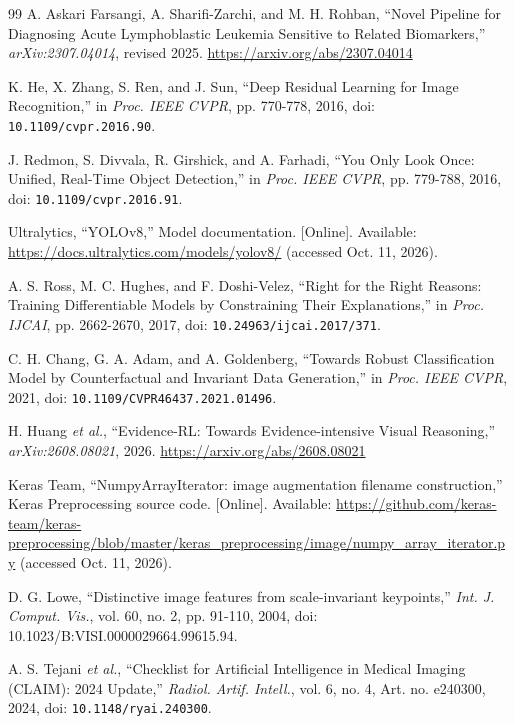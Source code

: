 \begin{thebibliography}{99}
 A. Askari Farsangi, A. Sharifi-Zarchi, and M. H. Rohban, ``Novel Pipeline for Diagnosing Acute Lymphoblastic Leukemia Sensitive to Related Biomarkers,'' \emph{arXiv:2307.04014}, revised 2025. \url{https://arxiv.org/abs/2307.04014}

 K. He, X. Zhang, S. Ren, and J. Sun, ``Deep Residual Learning for Image Recognition,'' in \emph{Proc. IEEE CVPR}, pp. 770-778, 2016, doi: \nolinkurl{10.1109/cvpr.2016.90}.

 J. Redmon, S. Divvala, R. Girshick, and A. Farhadi, ``You Only Look Once: Unified, Real-Time Object Detection,'' in \emph{Proc. IEEE CVPR}, pp. 779-788, 2016, doi: \nolinkurl{10.1109/cvpr.2016.91}.

 Ultralytics, ``YOLOv8,'' Model documentation. [Online]. Available: \url{https://docs.ultralytics.com/models/yolov8/} (accessed Oct. 11, 2026).

 A. S. Ross, M. C. Hughes, and F. Doshi-Velez, ``Right for the Right Reasons: Training Differentiable Models by Constraining Their Explanations,'' in \emph{Proc. IJCAI}, pp. 2662-2670, 2017, doi: \nolinkurl{10.24963/ijcai.2017/371}.

 C. H. Chang, G. A. Adam, and A. Goldenberg, ``Towards Robust Classification Model by Counterfactual and Invariant Data Generation,'' in \emph{Proc. IEEE CVPR}, 2021, doi: \nolinkurl{10.1109/CVPR46437.2021.01496}.

 H. Huang \emph{et al.}, ``Evidence-RL: Towards Evidence-intensive Visual Reasoning,'' \emph{arXiv:2608.08021}, 2026. \url{https://arxiv.org/abs/2608.08021}

 Keras Team, ``NumpyArrayIterator: image augmentation filename construction,'' Keras Preprocessing source code. [Online]. Available: \url{https://github.com/keras-team/keras-preprocessing/blob/master/keras_preprocessing/image/numpy_array_iterator.py} (accessed Oct. 11, 2026).

 D. G. Lowe, ``Distinctive image features from scale-invariant keypoints,'' \emph{Int. J. Comput. Vis.}, vol. 60, no. 2, pp. 91-110, 2004, doi: 10.1023/B:VISI.0000029664.99615.94.

 A. S. Tejani \emph{et al.}, ``Checklist for Artificial Intelligence in Medical Imaging (CLAIM): 2024 Update,'' \emph{Radiol. Artif. Intell.}, vol. 6, no. 4, Art. no. e240300, 2024, doi: \nolinkurl{10.1148/ryai.240300}.


\end{thebibliography}
